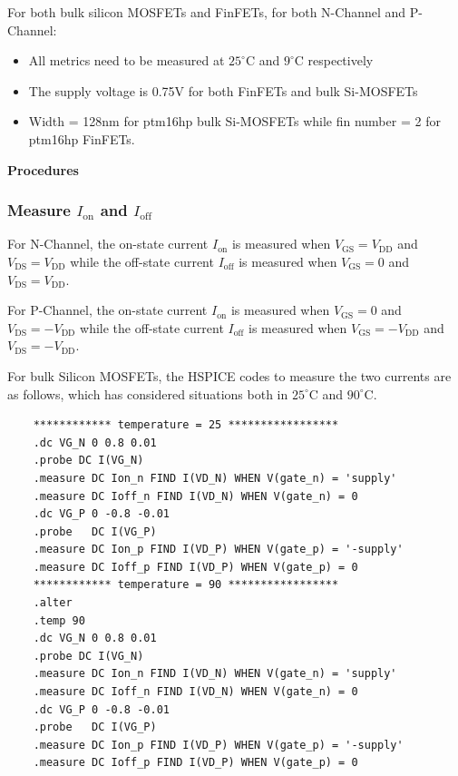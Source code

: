 \documentclass[UTF8,12pt,a4paper]{article}
\begin{document}
For both bulk silicon MOSFETs and FinFETs, for both N-Channel and P-Channel:
\begin{itemize}
	\item All metrics need to be measured at $25^\circ$C and $9^\circ$C respectively
	\item The supply voltage is 0.75V for both FinFETs and bulk Si-MOSFETs
	\item Width = 128nm for ptm16hp bulk Si-MOSFETs while fin number = 2 for ptm16hp FinFETs.
\end{itemize}


\textbf{Procedures}

\subsubsection{Measure $I_{\text{on}}$ and $I_{\text{off}}$}

For N-Channel, the on-state current $I_{\text{on}}$ is measured when $V_{\text{GS}}=V_{\text{DD}}$ and $V_{\text{DS}}=V_{\text{DD}}$ while the off-state current $I_{\text{off}}$ is measured when $V_{\text{GS}}=0$ and $V_{\text{DS}}=V_{\text{DD}}$.

For P-Channel, the on-state current $I_{\text{on}}$ is measured when $V_{\text{GS}}=0$ and $V_{\text{DS}}=-V_{\text{DD}}$ while the off-state current $I_{\text{off}}$ is measured when $V_{\text{GS}}=-V_{\text{DD}}$ and $V_{\text{DS}}=-V_{\text{DD}}$.

For bulk Silicon MOSFETs, the HSPICE codes to measure the two currents are as follows, which has considered situations both in $25^\circ$C and $90^\circ$C.
\begin{lstlisting}
    ************ temperature = 25 *****************
    .dc VG_N 0 0.8 0.01 
    .probe DC I(VG_N)
    .measure DC Ion_n FIND I(VD_N) WHEN V(gate_n) = 'supply'
    .measure DC Ioff_n FIND I(VD_N) WHEN V(gate_n) = 0
    .dc VG_P 0 -0.8 -0.01 
    .probe   DC I(VG_P)
    .measure DC Ion_p FIND I(VD_P) WHEN V(gate_p) = '-supply'
    .measure DC Ioff_p FIND I(VD_P) WHEN V(gate_p) = 0
    ************ temperature = 90 *****************
    .alter
    .temp 90
    .dc VG_N 0 0.8 0.01 
    .probe DC I(VG_N)
    .measure DC Ion_n FIND I(VD_N) WHEN V(gate_n) = 'supply'
    .measure DC Ioff_n FIND I(VD_N) WHEN V(gate_n) = 0
    .dc VG_P 0 -0.8 -0.01 
    .probe   DC I(VG_P)
    .measure DC Ion_p FIND I(VD_P) WHEN V(gate_p) = '-supply'
    .measure DC Ioff_p FIND I(VD_P) WHEN V(gate_p) = 0
\end{lstlisting}
\end{document}
